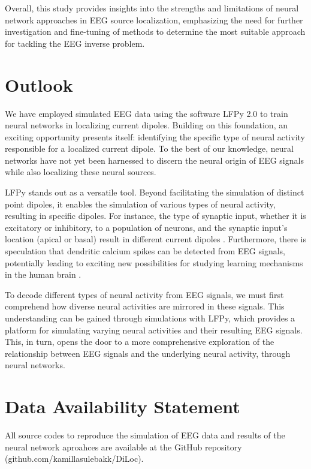 \documentclass[a4paper, UKenglish, 11pt]{uiomaster}
\begin{document}
Overall, this study provides insights into the strengths and limitations of neural network approaches in EEG source localization, emphasizing the need for further investigation and fine-tuning of methods to determine the most suitable approach for tackling the EEG inverse problem.


\section{Outlook} \label{sec:outlook}
We have employed simulated EEG data using the software LFPy 2.0 to train neural networks in localizing current dipoles. Building on this foundation, an exciting opportunity presents itself: identifying the specific type of neural activity responsible for a localized current dipole. To the best of our knowledge, neural networks have not yet been harnessed to discern the neural origin of EEG signals while also localizing these neural sources.

LFPy stands out as a versatile tool. Beyond facilitating the simulation of distinct point dipoles, it enables the simulation of various types of neural activity, resulting in specific dipoles. For instance, the type of synaptic input, whether it is excitatory or inhibitory, to a population of neurons, and the synaptic input's location (apical or basal) result in different current dipoles \cite{LFPy}.  Furthermore, there is speculation that dendritic calcium spikes can be detected from EEG signals, potentially leading to exciting new possibilities for studying learning mechanisms in the human brain \cite{suzuki2017dendritic}.

To decode different types of neural activity from EEG signals, we must first comprehend how diverse neural activities are mirrored in these signals. This understanding can be gained through simulations with LFPy, which provides a platform for simulating varying neural activities and their resulting EEG signals. This, in turn, opens the door to a more comprehensive exploration of the relationship between EEG signals and the underlying neural activity, through neural networks.




\section{Data Availability Statement}
All source codes to reproduce the simulation of EEG data and results of the neural network aproahces are available at the GitHub repository (github.com/kamillasulebakk/DiLoc). 
\end{document}
